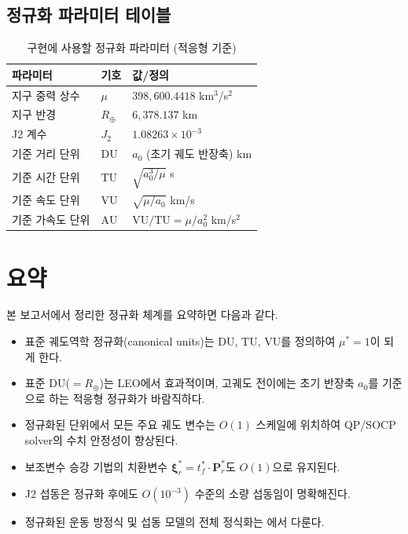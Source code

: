 \documentclass[11pt]{article}
\begin{document}
\subsection{정규화 파라미터 테이블}

\begin{table}[h]
  \centering
  \caption{구현에 사용할 정규화 파라미터 (적응형 기준)}
  \label{tab:norm_params}
  \begin{tabular}{lll}
    \toprule
    파라미터 & 기호 & 값/정의 \\
    \midrule
    지구 중력 상수 & $\mu$ & $398{,}600.4418$ km$^3$/s$^2$ \\
    지구 반경 & $R_\oplus$ & $6{,}378.137$ km \\
    J2 계수 & $J_2$ & $1.08263 \times 10^{-3}$ \\
    기준 거리 단위 & $\text{DU}$ & $a_0$ (초기 궤도 반장축) km \\
    기준 시간 단위 & $\text{TU}$ & $\sqrt{a_0^3/\mu}$ s \\
    기준 속도 단위 & $\text{VU}$ & $\sqrt{\mu/a_0}$ km/s \\
    기준 가속도 단위 & $\text{AU}$ & $\text{VU}/\text{TU} = \mu/a_0^2$ km/s$^2$ \\
    \bottomrule
  \end{tabular}
\end{table}

\vfill
\pagebreak

\section{요약}

본 보고서에서 정리한 정규화 체계를 요약하면 다음과 같다.

\begin{itemize}
  \item 표준 궤도역학 정규화(canonical units)는 DU, TU, VU를 정의하여 $\mu^* = 1$이 되게 한다.
  \item 표준 DU($= R_\oplus$)는 LEO에서 효과적이며, 고궤도 전이에는 초기 반장축 $a_0$를 기준으로 하는
        적응형 정규화가 바람직하다.
  \item 정규화된 단위에서 모든 주요 궤도 변수는 $O(1)$ 스케일에 위치하여 QP/SOCP solver의 수치 안정성이 향상된다.
  \item 보조변수 승강 기법의 치환변수 $\boldsymbol{\xi}_r^* = t_f^* \cdot \mathbf{P}_r^*$도 $O(1)$으로 유지된다.
  \item J2 섭동은 정규화 후에도 $O(10^{-3})$ 수준의 소량 섭동임이 명확해진다.
  \item 정규화된 운동 방정식 및 섭동 모델의 전체 정식화는 \cite{report002}에서 다룬다.
\end{itemize}



\end{document}

